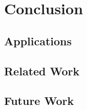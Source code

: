 \section{Conclusion}

\subsection{Applications}

\subsection{Related Work}

\subsection{Future Work}

